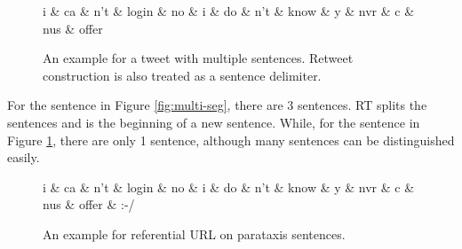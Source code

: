 \documentclass[11pt,a4paper]{article}
\begin{document}
\begin{figure}[t]
	\centering
	\small
	\begin{dependency}[edge slant=2, text only label, label style=above]
		\begin{deptext}
			i \& ca \& n't \& login \& no \& i \& do \& n't \& know \& y \& nvr \& c \& nus \& offer \\
		\end{deptext}
	\end{dependency}
	\caption{An example for a tweet with multiple sentences. 
		Retweet  construction is also treated as a sentence delimiter.}\label{fig:single-seg}
\end{figure}

For the sentence in Figure \ref{fig:multi-seg},  there are 3 sentences.
RT splits the sentences and is the beginning of a new sentence.
While, for the sentence in Figure \ref{fig:single-seg},
there are only 1 sentence, although many sentences can be distinguished easily. 

\begin{figure}[t]
	\centering
	\small
	\begin{dependency}[edge slant=2, text only label, label style=above]
		\begin{deptext}
			i \& ca \& n't \& login \& no \& i \& do \& n't \& know \& y \& nvr \& c \& nus \& offer  \& :-/ \\
		\end{deptext}
	\end{dependency}
	\caption{An example for referential URL on parataxis sentences.}\label{fig:ref-url-on-para-sent}
\end{figure}
\end{document}
